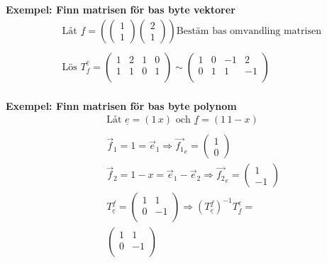 \textbf{Exempel: Finn matrisen för bas byte vektorer} %
\begin{align*}
  &\quad  \text{Låt } \underline{f} =
  \left( \begin{pmatrix} 1 \\ 1 \end{pmatrix} \begin{pmatrix} 2 \\ 1 \end{pmatrix} \right)
  \text{Bestäm bas omvandling matrisen }   \\
  &\quad  \\
  &\quad  \text{Lös } T^{\underline{e}}_{\underline{f}} = 
  \left(\begin{array}{cc|cc}
    1 & 2 & 1 & 0  \\
    1 & 1 & 0 & 1  \\
  \end{array}\right) \sim
    \left(\begin{array}{cc|cc}
    1 & 0 & -1 &  2  \\
    0 & 1 &  1 & -1  \\
  \end{array}\right) \\
\end{align*}

\textbf{Exempel: Finn matrisen för bas byte polynom}
\begin{align*}
  &\quad  \text{Låt } \underline{e}=(1 \, x) \text{ och } \underline{f}=(1 \, 1-x) \\
  &\quad  \\
  &\quad  \vec{f}_1 = 1 = \vec{e}_1 \Rightarrow \vec{f_1}_e = \begin{pmatrix} 1 \\ 0 \end{pmatrix} \\
  &\quad  \vec{f}_2 = 1-x = \vec{e}_1 - \vec{e}_2 \Rightarrow \vec{f_2}_e = \begin{pmatrix} 1 \\ -1 \end{pmatrix} \\
  &\quad  T^{\underline{f}}_{\underline{e}} =
  \left(\begin{array}{cc}
    1 &  1  \\
    0 & -1  \\
  \end{array}\right) \Rightarrow{} {(T^{\underline{f}}_{\underline{e}})}^{-1} T^{\underline{e}}_{\underline{f}} = \\
  &\quad \left(\begin{array}{cc}
    1 &  1  \\
    0 & -1  \\
  \end{array}\right) \text{} \\
\end{align*}

